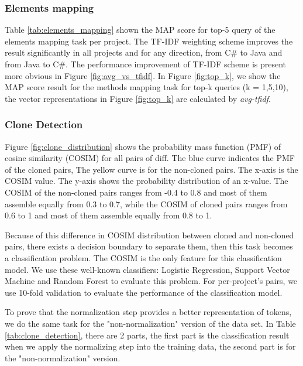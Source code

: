 \subsubsection{Elements mapping}

Table \ref{tab:elements_mapping} shown the MAP score for top-5 query of the elements mapping task per project. The TF-IDF weighting scheme improves the result significantly in all projects and for any direction, from C\# to Java and from Java to C\#. The performance improvement of TF-IDF scheme is present more obvious in Figure \ref{fig:avg_vs_tfidf}. In Figure \ref{fig:top_k}, we show the MAP score result for the methods mapping task for top-k queries (k = 1,5,10), the vector representations in Figure \ref{fig:top_k} are calculated by \textit{avg-tfidf}.








\subsubsection{Clone Detection}
Figure \ref{fig:clone_distribution} shows the probability mass function (PMF) of cosine similarity (COSIM) for all pairs of diff. The blue curve indicates the PMF of the cloned pairs, The yellow curve is for the non-cloned pairs. The x-axis is the COSIM value. The y-axis shows the probability distribution of an x-value. The COSIM of the non-cloned pairs ranges from -0.4 to 0.8 and most of them assemble equally from 0.3 to 0.7, while the COSIM of cloned pairs ranges from 0.6 to 1 and most of them assemble equally from 0.8 to 1.

Because of this difference in COSIM distribution between cloned and non-cloned pairs, there exists a decision boundary to separate them, then this task becomes a classification problem. The COSIM is the only feature for this classification model. We use these well-known classifiers: Logistic Regression, Support Vector Machine and Random Forest to evaluate this problem. For per-project's pairs, we use 10-fold validation to evaluate the performance of the classification model.

To prove that the normalization step provides a better representation of tokens, we do the same task for the "non-normalization" version of the data set. In Table \ref{tab:clone_detection}, there are 2 parts, the first part is the classification result when we apply the normalizing step into the training data, the second part is for the "non-normalization" version.





